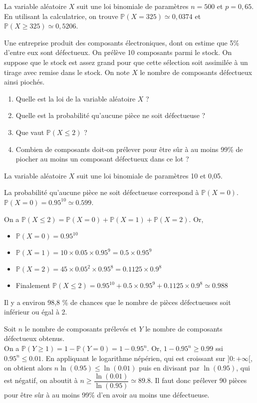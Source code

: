 \documentclass[11pt,fleqn, openany]{book} %
\begin{document}
\begin{solution}La variable aléatoire $X$ suit une loi binomiale de paramètres $n=500$ et $p=0,65$. En utilisant la calculatrice, on trouve $\mathbb{P}(X=325) \simeq 0,0374$ et $\mathbb{P}(X \geqslant 325)\simeq 0,5206$.\end{solution}

\begin{exercise}

Une entreprise produit des composants électroniques, dont on estime que 5\% d'entre eux sont défectueux. On prélève 10 composants parmi le stock. On suppose que le stock est assez grand pour que cette sélection soit assimilée à un tirage avec remise dans le stock. On note $X$ le nombre de composants défectueux ainsi piochés.

\begin{enumerate}
\item Quelle est la loi de la variable aléatoire $X$ ?
\item Quelle est la probabilité qu'aucune pièce ne soit défectueuse ?
\item Que vaut $\mathbb{P}(X \leqslant 2)$ ? 
\item Combien de composants doit-on prélever pour être sûr à au moins 99\% de piocher au moins un composant défectueux dans ce lot ?
\end{enumerate}\end{exercise}

\begin{solution}
La variable aléatoire $X$ suit une loi binomiale de paramètres 10 et 0,05.

La probabilité qu'aucune pièce ne soit défectueuse correspond à $\mathbb{P}(X=0)$. $\mathbb{P}(X=0)= 0.95^{10} \simeq 0.599$.

On a $\mathbb{P}(X \leqslant 2) = \mathbb{P}(X =0) + \mathbb{P}(X=1)  + \mathbb{P}(X=2)$. Or,
\begin{itemize}
\item $\mathbb{P}(X=0)=0.95^{10}$
\item $\mathbb{P}(X=1)=10 \times 0.05 \times 0.95 ^9 = 0.5 \times 0.95 ^9$
\item $\mathbb{P}(X=2)= 45 \times 0.05^2 \times 0.95^8 = 0.1125 \times 0.9^8$
\item Finalement $\mathbb{P}(X \leqslant 2)= 0.95^{10}+0.5 \times 0.95^9 + 0.1125 \times 0.9^8 \simeq 0.988$
\end{itemize} Il y a environ 98,8 \% de chances que le nombre de pièces défectueuses soit inférieur ou égal à 2.

Soit $n$ le nombre de composants prélevés et $Y$ le nombre de composants défectueux obtenus. \\On a $\mathbb{P}(Y\geqslant 1)=1-\mathbb{P}(Y=0)=1-0.95^n$. Or, $1-0.95^n \geqslant 0.99$ ssi $0.95^n \leqslant 0.01$. En appliquant le logarithme népérien, qui est croissant sur $]0:+\infty[$, on obtient alors $n \ln(0.95) \leqslant \ln(0.01)$ puis en divisant par $\ln(0.95)$, qui est négatif, on aboutit à $n \geqslant \dfrac{\ln(0.01)}{\ln(0.95)}\simeq 89.8$. Il faut donc prélever 90 pièces pour être sûr à au moins 99\% d'en avoir au moins une défectueuse.
\end{solution}
\end{document}
